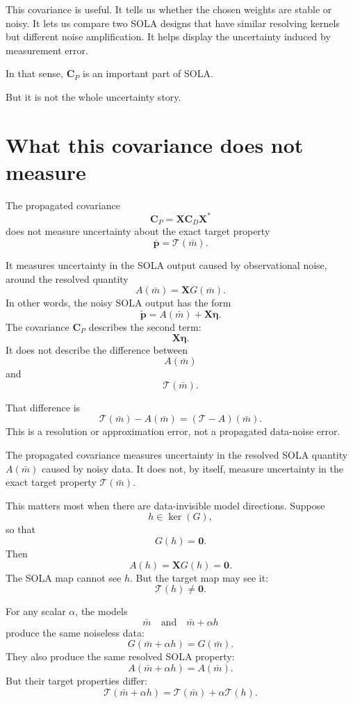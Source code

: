 \documentclass[11pt,openany]{book}
\theoremstyle{definition}
\theoremstyle{remark}
\newcommand{\Tau}{\mathcal{T}}
\newcommand{\kernel}{\operatorname{ker}}
\begin{document}
This covariance is useful. It tells us whether the chosen weights are stable or noisy. It lets us
compare two SOLA designs that have similar resolving kernels but different noise amplification.
It helps display the uncertainty induced by measurement error.

In that sense, \(\mathbf C_P\) is an important part of SOLA.

But it is not the whole uncertainty story.

\section{What this covariance does not measure}

The propagated covariance
\[
  \mathbf C_P=\mathbf X\mathbf C_D\mathbf X^*
\]
does not measure uncertainty about the exact target property
\[
  \bar{\mathbf p}
  =
  \Tau(\bar m).
\]

It measures uncertainty in the SOLA output caused by observational noise, around the resolved
quantity
\[
  A(\bar m)
  =
  \mathbf XG(\bar m).
\]
In other words, the noisy SOLA output has the form
\[
  \widetilde{\mathbf p}
  =
  A(\bar m)+\mathbf X\boldsymbol\eta.
\]
The covariance \(\mathbf C_P\) describes the second term:
\[
  \mathbf X\boldsymbol\eta.
\]
It does not describe the difference between
\[
  A(\bar m)
\]
and
\[
  \Tau(\bar m).
\]

That difference is
\[
  \Tau(\bar m)-A(\bar m)
  =
  (\Tau-A)(\bar m).
\]
This is a resolution or approximation error, not a propagated data-noise error.

\begin{warningbox}
The propagated covariance measures uncertainty in the resolved SOLA quantity \(A(\bar m)\)
caused by noisy data. It does not, by itself, measure uncertainty in the exact target property
\(\Tau(\bar m)\).
\end{warningbox}

This matters most when there are data-invisible model directions. Suppose
\[
  h\in\kernel(G),
\]
so that
\[
  G(h)=\mathbf 0.
\]
Then
\[
  A(h)=\mathbf XG(h)=\mathbf 0.
\]
The SOLA map cannot see \(h\). But the target map may see it:
\[
  \Tau(h)\neq\mathbf 0.
\]

For any scalar \(\alpha\), the models
\[
  \bar m
  \quad\text{and}\quad
  \bar m+\alpha h
\]
produce the same noiseless data:
\[
  G(\bar m+\alpha h)=G(\bar m).
\]
They also produce the same resolved SOLA property:
\[
  A(\bar m+\alpha h)=A(\bar m).
\]
But their target properties differ:
\[
  \Tau(\bar m+\alpha h)
  =
  \Tau(\bar m)+\alpha\Tau(h).
\]
\end{document}
